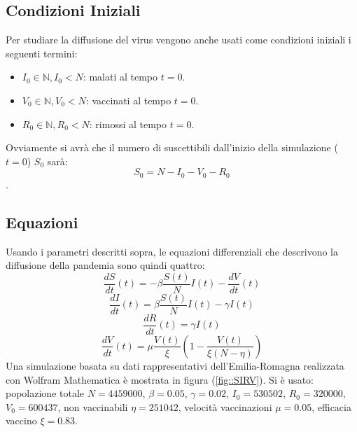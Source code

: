 \documentclass{article}
\begin{document}
\subsection{Condizioni Iniziali}
Per studiare la diffusione del virus vengono anche usati come 
condizioni iniziali i seguenti termini:
\begin{itemize}
\item $I_0 \in \mathbb{N}, I_0 < N$: malati al tempo $t = 0$.
\item $V_0 \in \mathbb{N}, V_0 < N $: vaccinati al tempo $t = 0$.
\item $R_0 \in \mathbb{N}, R_0 < N $: rimossi al tempo $t = 0$.
\end{itemize}
Ovviamente si avrà che il numero di suscettibili dall'inizio della 
simulazione ($t = 0$) $S_0$ sarà: \\
$$S_0 = N - I_0 - V_0 - R_0$$.\\
\subsection{Equazioni}
Usando i parametri descritti sopra, le equazioni differenziali che 
descrivono la diffusione della pandemia sono quindi quattro:\\
\begin{equation} \label{eq::S}
\frac{dS}{dt}(t)= -\beta \frac{S(t)}{N}I(t) - \frac{dV}{dt}(t)
\end{equation}
\begin{equation}\label{eq::I}
\frac{dI}{dt}(t)= \beta \frac{S(t)}{N}I(t) - \gamma I(t)
\end{equation}
\begin{equation}\label{eq::R}
\frac{dR}{dt}(t)= \gamma I(t)
\end{equation}
\begin{equation}\label{eq::V}
\frac{dV}{dt}(t)= \mu\frac{V(t)}{\xi}\left( 1-\frac{V(t)}{\xi(N-\eta)}\right)
\end{equation}
Una simulazione basata su dati rappresentativi dell'Emilia-Romagna
realizzata con Wolfram Mathematica è mostrata in figura 
(\ref{fig::SIRV}). 
Si è usato: popolazione totale $N=4459000$, $\beta=0.05$, 
$\gamma=0.02$, $I_0 = 530502$, $R_0 = 320000$, $V_0 = 600437$,
non vaccinabili $\eta = 251042$, 
velocità vaccinazioni $\mu = 0.05$, efficacia 
vaccino $\xi= 0.83$.
\end{document}
